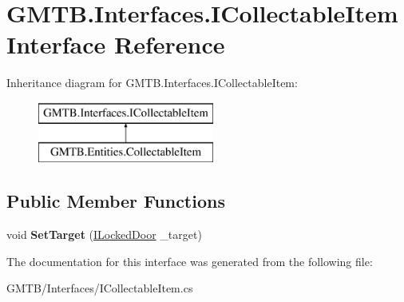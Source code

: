 \hypertarget{interface_g_m_t_b_1_1_interfaces_1_1_i_collectable_item}{}\section{G\+M\+T\+B.\+Interfaces.\+I\+Collectable\+Item Interface Reference}
\label{interface_g_m_t_b_1_1_interfaces_1_1_i_collectable_item}
Inheritance diagram for G\+M\+T\+B.\+Interfaces.\+I\+Collectable\+Item\+:\begin{figure}[H]
\begin{center}
\leavevmode
\includegraphics[height=2.000000cm]{interface_g_m_t_b_1_1_interfaces_1_1_i_collectable_item}
\end{center}
\end{figure}
\subsection*{Public Member Functions}
\begin{DoxyCompactItemize}
\item 
\mbox{\label{interface_g_m_t_b_1_1_interfaces_1_1_i_collectable_item_a4782ecd965af8d61d6db5bbe912251b5}} 
void {\bfseries Set\+Target} (\mbox{\hyperlink{interface_g_m_t_b_1_1_interfaces_1_1_i_locked_door}{I\+Locked\+Door}} \+\_\+target)
\end{DoxyCompactItemize}


The documentation for this interface was generated from the following file\+:\begin{DoxyCompactItemize}
\item 
G\+M\+T\+B/\+Interfaces/I\+Collectable\+Item.\+cs\end{DoxyCompactItemize}
